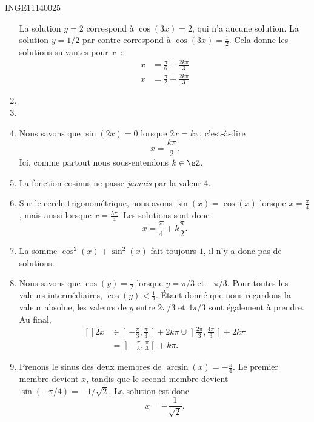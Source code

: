 \begin{corrige}{INGE11140025}
\begin{enumerate}
			La solution $y=2$ correspond à $\cos(3x)=2$, qui n'a aucune solution. La solution $y=1/2$ par contre correspond à $\cos(3x)=\frac{ 1 }{2}$. Cela donne les solutions suivantes pour $x$~:
			\begin{subequations}
				\begin{align}
					x&=\frac{ \pi }{ 6 }+\frac{ 2k\pi }{ 3 }\\
					x&=\frac{ \pi }{ 2 }+\frac{ 2k\pi }{ 3 }
				\end{align}
			\end{subequations}
		\item
		\item
		\item
			Nous savons que $\sin(2x)=0$ lorsque $2x=k\pi$, c'est-à-dire
			\begin{equation}
				x=\frac{ k\pi }{2}.
			\end{equation}
			Ici, comme partout nous sous-entendons $k\in\eZ$.
		\item
			La fonction cosinus ne passe \emph{jamais} par la valeur 4.
		\item
			Sur le cercle trigonométrique, nous avons $\sin(x)=\cos(x)$ lorsque $x=\frac{ \pi }{ 4 }$, mais aussi lorsque $x=\frac{ 5\pi }{ 4 }$. Les solutions sont donc
			\begin{equation}
				x=\frac{ \pi }{ 4 }+k\frac{ \pi }{ 2 }.
			\end{equation}
		\item
			La somme $\cos^2(x)+\sin^2(x)$ fait toujours $1$, il n'y a donc pas de solutions.
		\item
			Nous savons que $\cos(y)=\frac{ 1 }{2}$ lorsque $y=\pi/3$ et $-\pi/3$. Pour toutes les valeurs intermédiaires, $\cos(y)<\frac{ 1 }{2}$. Étant donné que nous regardons la valeur absolue, les valeurs de $y$ entre $2\pi/3$ et $4\pi/3$ sont également à prendre. Au final,
			\begin{equation}
				\begin{aligned}[]
				2x&\in\mathopen] -\frac{ \pi }{ 3 } , \frac{ \pi }{ 3 } \mathclose[+2k\pi \cup\mathopen] \frac{ 2\pi }{ 3 } , \frac{ 4\pi }{ 3 } \mathclose[+2k\pi\\
				&=\mathopen] -\frac{ \pi }{ 3 } , \frac{ \pi }{ 3 } \mathclose[+k\pi.
				\end{aligned}
			\end{equation}
		\item
			Prenons le sinus des deux membres de $\arcsin(x)=-\frac{ \pi }{ 4 }$. Le premier membre devient $x$, tandis que le second membre devient $\sin(-\pi/4)=-1/\sqrt{2}$. La solution est donc
			\begin{equation}
				x=-\frac{1}{ \sqrt{2} }.
			\end{equation}
	\end{enumerate}
\end{corrige}
